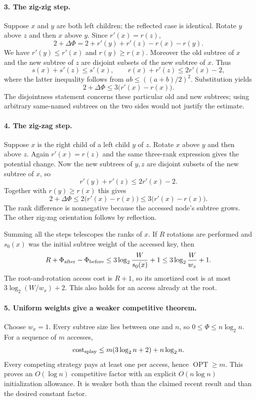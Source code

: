 \documentclass[11pt]{article}
\begin{document}
\paragraph{3. The zig-zig step.}
Suppose $x$ and $y$ are both left children; the reflected case is identical. Rotate $y$ above $z$ and then $x$ above $y$. Since $r'(x)=r(z)$,
\[
 2+\Delta\Phi=2+r'(y)+r'(z)-r(x)-r(y).
\]
We have $r'(y)\le r'(x)$ and $r(y)\ge r(x)$. Moreover the old subtree of $x$ and the new subtree of $z$ are disjoint subsets of the new subtree of $x$. Thus
\[
 s(x)+s'(z)\le s'(x),\qquad
 r(x)+r'(z)\le2r'(x)-2,
\]
where the latter inequality follows from $ab\le((a+b)/2)^2$. Substitution yields
\[
 2+\Delta\Phi\le3\bigl(r'(x)-r(x)\bigr).
\]
The disjointness statement concerns these particular old and new subtrees; using arbitrary same-named subtrees on the two sides would not justify the estimate.

\paragraph{4. The zig-zag step.}
Suppose $x$ is the right child of a left child $y$ of $z$. Rotate $x$ above $y$ and then above $z$. Again $r'(x)=r(z)$ and the same three-rank expression gives the potential change. Now the new subtrees of $y,z$ are disjoint subsets of the new subtree of $x$, so
\[
 r'(y)+r'(z)\le2r'(x)-2.
\]
Together with $r(y)\ge r(x)$ this gives
\[
 2+\Delta\Phi\le2\bigl(r'(x)-r(x)\bigr)
 \le3\bigl(r'(x)-r(x)\bigr).
\]
The rank difference is nonnegative because the accessed node's subtree grows. The other zig-zag orientation follows by reflection.

Summing all the steps telescopes the ranks of $x$. If $R$ rotations are performed and $s_0(x)$ was the initial subtree weight of the accessed key, then
\[
 R+\Phi_{\rm after}-\Phi_{\rm before}
 \le3\log_2\frac W{s_0(x)}+1
 \le3\log_2\frac W{w_x}+1.
\]
The root-and-rotation access cost is $R+1$, so its amortized cost is at most $3\log_2(W/w_x)+2$. This also holds for an access already at the root.

\paragraph{5. Uniform weights give a weaker competitive theorem.}
Choose $w_x=1$. Every subtree size lies between one and $n$, so $0\le\Phi\le n\log_2n$. For a sequence of $m$ accesses,
\[
 \operatorname{cost}_{\rm splay}
 \le m(3\log_2n+2)+n\log_2n.
\]
Every competing strategy pays at least one per access, hence $\operatorname{OPT}\ge m$. This proves an $O(\log n)$ competitive factor with an explicit $O(n\log n)$ initialization allowance. It is weaker both than the claimed recent result and than the desired constant factor.
\end{document}
